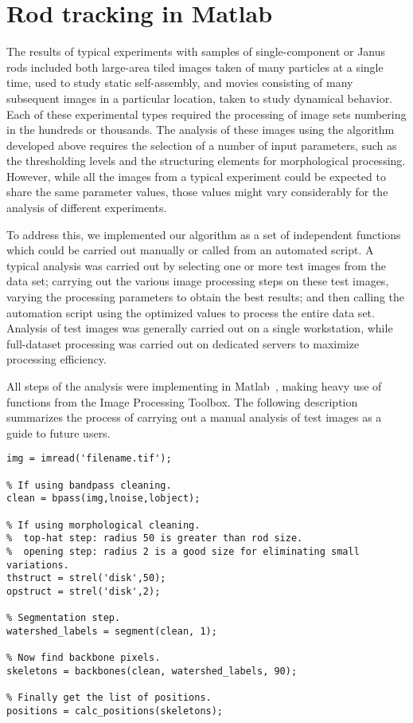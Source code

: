 \chapter{Rod tracking in Matlab}
\label{sec:matlab-implementation}

The results of typical experiments with samples of single-component or Janus rods included both 
large-area tiled images taken of many particles at a single time,
used to study static self-assembly, and movies consisting of many subsequent images in a 
particular location, taken to study dynamical behavior.  Each of these experimental types required the processing
of image sets numbering in the hundreds or thousands.  The analysis of these images using the algorithm developed
above requires the selection of a number of input parameters, such as the thresholding levels and the 
structuring elements for morphological processing.  However, while all the images from a typical
experiment could be expected to share the same parameter values, those values might vary considerably for the 
analysis of different
experiments.

To address this, we implemented our algorithm as a set of independent functions which could be carried out manually 
or called from an automated script. A typical analysis was carried out by selecting one or more 
test images from the data set; carrying out the various image processing steps on these test images, varying
the processing parameters to obtain the best results; and then calling the automation script using the 
optimized values to process the entire data set.  Analysis of test images was generally carried out on a single
workstation, while full-dataset processing was carried out on dedicated servers to maximize processing efficiency.

All steps of the analysis were implementing in Matlab~\cite{matlab}, making heavy use of functions from the
Image Processing Toolbox.  The following description summarizes the process of carrying out a manual analysis of
test images as a guide to future users.

\begin{lstlisting}[label=ls:manual,caption=Typical sequence of a manual analysis]
% Load the image.
img = imread('filename.tif');

% If using bandpass cleaning.
clean = bpass(img,lnoise,lobject);

% If using morphological cleaning.
%  top-hat step: radius 50 is greater than rod size.
%  opening step: radius 2 is a good size for eliminating small variations.
thstruct = strel('disk',50);
opstruct = strel('disk',2);

% Segmentation step.
watershed_labels = segment(clean, 1);

% Now find backbone pixels.
skeletons = backbones(clean, watershed_labels, 90);

% Finally get the list of positions.
positions = calc_positions(skeletons);
\end{lstlisting}

